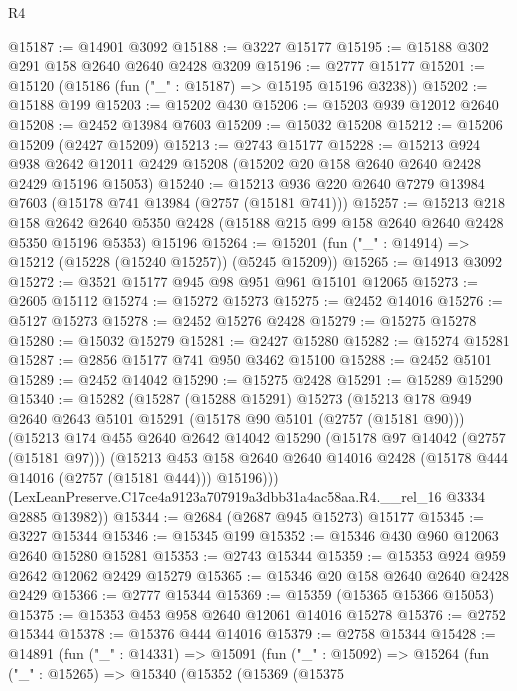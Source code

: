 \begin{lexlean}{R4}
\begin{coremodule}
@15187 := @14901 @3092
@15188 := @3227 @15177
@15195 := @15188 @302 @291 @158 @2640 @2640 @2428 @3209
@15196 := @2777 @15177
@15201 := @15120 (@15186 (fun ("_" : @15187) => @15195 @15196 @3238))
@15202 := @15188 @199
@15203 := @15202 @430
@15206 := @15203 @939 @12012 @2640
@15208 := @2452 @13984 @7603
@15209 := @15032 @15208
@15212 := @15206 @15209 (@2427 @15209)
@15213 := @2743 @15177
@15228 := @15213
    @924
    @938
    @2642
    @12011
    @2429
    @15208
    (@15202 @20 @158 @2640 @2640 @2428 @2429 @15196 @15053)
@15240 := @15213 @936 @220 @2640 @7279 @13984 @7603 (@15178 @741 @13984 (@2757 (@15181 @741)))
@15257 := @15213
    @218
    @158
    @2642
    @2640
    @5350
    @2428
    (@15188 @215 @99 @158 @2640 @2640 @2428 @5350 @15196 @5353)
    @15196
@15264 := @15201 (fun ("_" : @14914) => @15212 (@15228 (@15240 @15257)) (@5245 @15209))
@15265 := @14913 @3092
@15272 := @3521 @15177 @945 @98 @951 @961 @15101 @12065
@15273 := @2605 @15112
@15274 := @15272 @15273
@15275 := @2452 @14016
@15276 := @5127 @15273
@15278 := @2452 @15276 @2428
@15279 := @15275 @15278
@15280 := @15032 @15279
@15281 := @2427 @15280
@15282 := @15274 @15281
@15287 := @2856 @15177 @741 @950 @3462 @15100
@15288 := @2452 @5101
@15289 := @2452 @14042
@15290 := @15275 @2428
@15291 := @15289 @15290
@15340 := @15282
    (@15287
      (@15288 @15291)
      @15273
      (@15213
        @178
        @949
        @2640
        @2643
        @5101
        @15291
        (@15178 @90 @5101 (@2757 (@15181 @90)))
        (@15213
          @174
          @455
          @2640
          @2642
          @14042
          @15290
          (@15178 @97 @14042 (@2757 (@15181 @97)))
          (@15213
            @453
            @158
            @2640
            @2640
            @14016
            @2428
            (@15178 @444 @14016 (@2757 (@15181 @444)))
            @15196)))
      (LexLeanPreserve.C17ce4a9123a707919a3dbb31a4ac58aa.R4.__rel_16 @3334 @2885 @13982))
@15344 := @2684 (@2687 @945 @15273) @15177
@15345 := @3227 @15344
@15346 := @15345 @199
@15352 := @15346 @430 @960 @12063 @2640 @15280 @15281
@15353 := @2743 @15344
@15359 := @15353 @924 @959 @2642 @12062 @2429 @15279
@15365 := @15346 @20 @158 @2640 @2640 @2428 @2429
@15366 := @2777 @15344
@15369 := @15359 (@15365 @15366 @15053)
@15375 := @15353 @453 @958 @2640 @12061 @14016 @15278
@15376 := @2752 @15344
@15378 := @15376 @444 @14016
@15379 := @2758 @15344
@15428 := @14891
    (fun ("_" : @14331) =>
    @15091
      (fun ("_" : @15092) =>
      @15264
        (fun ("_" : @15265) =>
        @15340
          (@15352
            (@15369
              (@15375

\end{coremodule}
\end{lexlean}
